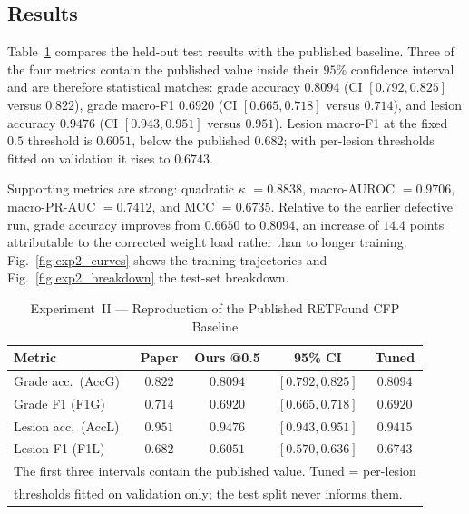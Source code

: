 \documentclass[journal,twoside,web]{ieeecolor}
\begin{document}
\subsection{Results}
Table~\ref{tab:exp2_res} compares the held-out test results with the published baseline.
Three of the four metrics contain the published value inside their $95\%$ confidence
interval and are therefore statistical matches: grade accuracy $0.8094$ (CI
$[0.792,0.825]$ versus $0.822$), grade macro-F1 $0.6920$ (CI $[0.665,0.718]$ versus
$0.714$), and lesion accuracy $0.9476$ (CI $[0.943,0.951]$ versus $0.951$). Lesion
macro-F1 at the fixed $0.5$ threshold is $0.6051$, below the published $0.682$; with
per-lesion thresholds fitted on validation it rises to $0.6743$.

Supporting metrics are strong: quadratic $\kappa$ $=0.8838$, macro-AUROC $=0.9706$,
macro-PR-AUC $=0.7412$, and MCC $=0.6735$. Relative to the earlier defective run, grade
accuracy improves from $0.6650$ to $0.8094$, an increase of $14.4$ points attributable to
the corrected weight load rather than to longer training.
Fig.~\ref{fig:exp2_curves} shows the training trajectories and
Fig.~\ref{fig:exp2_breakdown} the test-set breakdown.

\begin{table}[!t]
\caption{Experiment~II --- Reproduction of the Published RETFound CFP Baseline}
\label{tab:exp2_res}
\centering
\setlength{\tabcolsep}{3pt}
\begin{tabular}{|l|c|c|c|c|}
\hline
\textbf{Metric} & \textbf{Paper} & \textbf{Ours @0.5} & \textbf{95\% CI} & \textbf{Tuned} \\
\hline
Grade acc.\ (AccG) & $0.822$ & $0.8094$ & $[0.792,0.825]$ & $0.8094$ \\
Grade F1 (F1G) & $0.714$ & $0.6920$ & $[0.665,0.718]$ & $0.6920$ \\
Lesion acc.\ (AccL) & $0.951$ & $0.9476$ & $[0.943,0.951]$ & $0.9415$ \\
Lesion F1 (F1L) & $0.682$ & $0.6051$ & $[0.570,0.636]$ & $\mathbf{0.6743}$ \\
\hline
\multicolumn{5}{|l|}{\footnotesize The first three intervals contain the published
value. Tuned = per-lesion} \\
\multicolumn{5}{|l|}{\footnotesize thresholds fitted on validation only; the test split
never informs them.} \\
\hline
\end{tabular}
\end{table}
\end{document}
